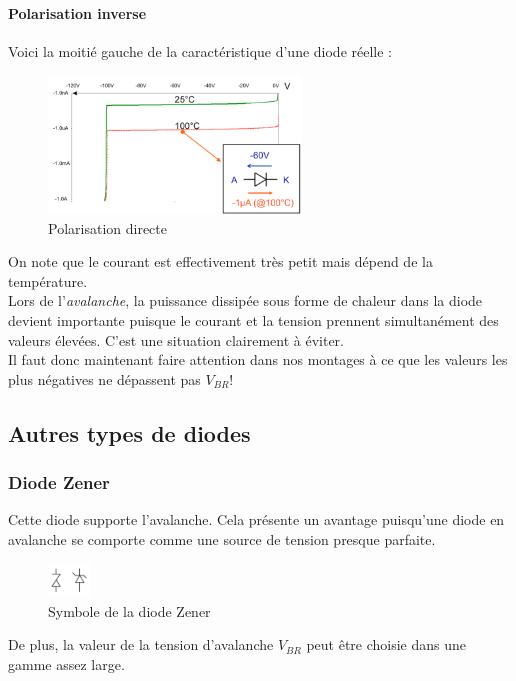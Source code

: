 \documentclass[a4paper]{article}
\begin{document}
    \paragraph{Polarisation inverse}
    Voici la moitié gauche de la caractéristique d'une diode réelle :
    \begin{figure}[H]
        \begin{center}
            \includegraphics[width=0.6\textwidth]{fig/5_dioderpolarisationinverse.png}
            \caption{Polarisation directe}
            \label{fig:5_dioderpolarisationinverse}
        \end{center}
    \end{figure}
    On note que le courant est effectivement très petit mais dépend de la température.\\

    Lors de l'\textit{avalanche}, la puissance dissipée sous forme de chaleur
    dans la diode devient importante puisque le courant et la tension prennent
    simultanément des valeurs élevées. C'est une situation clairement à éviter.\\

    Il faut donc maintenant faire attention dans nos montages à ce que les valeurs
    les plus négatives ne dépassent pas $V_{BR}$!

    \subsection{Autres types de diodes}
    \subsubsection{Diode Zener}
    Cette diode supporte l'avalanche. Cela présente un avantage puisqu'une
    diode en avalanche se comporte comme une source de tension presque parfaite.
    \begin{figure}[H]
        \begin{center}
            \includegraphics[width=0.1\textwidth]{fig/5_diodezener.png}
            \caption{Symbole de la diode Zener}
            \label{fig:5_diodezener}
        \end{center}
    \end{figure}
    De plus, la valeur de la tension d'avalanche $V_{BR}$ peut être choisie dans une
    gamme assez large.\\
\end{document}
